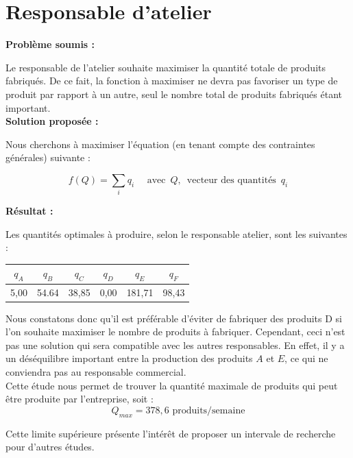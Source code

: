 \documentclass[paper=a4, fontsize=11pt]{report}
\numberwithin{equation}{section}		%
\numberwithin{figure}{section}			%
\numberwithin{table}{section}				%
\renewcommand{\bf}[1]{\textbf{#1}}
\begin{document}

\section{Responsable d'atelier}
\bf{Problème soumis :}

Le responsable de l'atelier souhaite maximiser la quantité totale de produits fabriqués. De ce fait, la fonction à maximiser ne devra pas favoriser un type de produit par rapport à un autre, seul le nombre total de produits fabriqués étant important.\\

\bf{Solution proposée :}

Nous cherchons à maximiser l'équation (en tenant compte des contraintes générales) suivante :

\[f(Q) = \sum_i q_i \quad \text{  avec } \, Q, \, \text{ vecteur des quantités } \, q_i \]

\bf{Résultat :}

Les quantités optimales à produire, selon le responsable atelier, sont les suivantes :

\begin{center}
\begin{tabular}{cccccc}
\hline 
$q_A$ & $q_B$ & $q_C$ & $q_D$ & $q_E$ & $q_F$ \\ 
\hline 
5,00 & 54.64 & 38,85 & 0,00 & 181,71 & 98,43 \\ 
\hline 
\end{tabular} 
\end{center}

Nous constatons donc qu'il est préférable d'éviter de fabriquer des produits D si l'on souhaite maximiser le nombre de produits à fabriquer. Cependant, ceci n'est pas une solution qui sera compatible avec les autres responsables. En effet, il y a un déséquilibre important entre la production des produits $A$ et $E$, ce qui ne conviendra pas au responsable commercial.\\

Cette étude nous permet de trouver la quantité maximale de produits qui peut être produite par l'entreprise, soit :
\[ Q_{max} = 378,6 \text{ produits/semaine}\]

Cette limite supérieure présente l'intérêt de proposer un intervale de recherche pour d'autres études.


\end{document}
